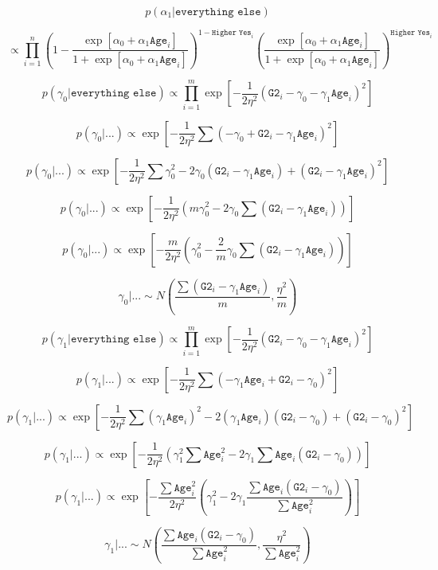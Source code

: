 \documentclass[11pt]{article}
\begin{document}
$$p(\alpha_1|\texttt{everything else})$$

$$\propto \prod_{i=1}^{n}(1-\frac{\exp[\alpha_0+\alpha_1\texttt{Age}_i]}{1+\exp[\alpha_0+\alpha_1\texttt{Age}_i]})^{1-\texttt{Higher Yes}_i}(\frac{\exp[\alpha_0+\alpha_1\texttt{Age}_i]}{1+\exp[\alpha_0+\alpha_1\texttt{Age}_i]})^{\texttt{Higher Yes}_i}$$

$$p(\gamma_0|\texttt{everything else}) \propto \prod_{i=1}^m  \exp \left[-\frac{1}{2\eta^2} (\texttt{G2}_i - \gamma_0 - \gamma_1 \texttt{Age}_i)^2 \right]$$

$$p(\gamma_0 | ...) \propto \exp \left[ -\frac{1}{2\eta^2} \sum (-\gamma_0 + \texttt{G2}_i - \gamma_1 \texttt{Age}_i)^2 \right]$$

$$p(\gamma_0 | ...) \propto \exp \left[ -\frac{1}{2\eta^2} \sum \gamma_0^2 - 2\gamma_0(\texttt{G2}_i - \gamma_1 \texttt{Age}_i) 
+  (\texttt{G2}_i - \gamma_1 \texttt{Age}_i)^2 \right]$$

$$p(\gamma_0 | ...) \propto \exp \left[ -\frac{1}{2\eta^2} (m\gamma_0^2 - 2\gamma_0\sum(\texttt{G2}_i - \gamma_1 \texttt{Age}_i)) \right]$$

$$p(\gamma_0 | ...) \propto \exp \left[ -\frac{m}{2\eta^2} (\gamma_0^2 - \frac{2}{m}\gamma_0\sum(\texttt{G2}_i - \gamma_1 \texttt{Age}_i)) \right]$$

$$\gamma_0 | ... \sim N\left( \frac{\sum(\texttt{G2}_i - \gamma_1 \texttt{Age}_i)}{m}, \frac{\eta^2}{m} \right)$$

$$p(\gamma_1|\texttt{everything else}) \propto \prod_{i=1}^m  \exp \left[-\frac{1}{2\eta^2} (\texttt{G2}_i - \gamma_0 - \gamma_1 \texttt{Age}_i)^2 \right]
$$

$$p(\gamma_1 | ...) \propto \exp \left[ -\frac{1}{2\eta^2} \sum (- \gamma_1 \texttt{Age}_i + \texttt{G2}_i -\gamma_0 )^2 \right]$$

$$p(\gamma_1 | ...) \propto \exp \left[ -\frac{1}{2\eta^2} \sum (\gamma_1 \texttt{Age}_i)^2 
-2 (\gamma_1 \texttt{Age}_i)(\texttt{G2}_i -\gamma_0 )
+ (\texttt{G2}_i -\gamma_0 )^2 \right]$$

$$p(\gamma_1 | ...) \propto \exp \left[ -\frac{1}{2\eta^2} 
(\gamma_1^2 \sum \texttt{Age}_i^2 
-2 \gamma_1 \sum \texttt{Age}_i(\texttt{G2}_i -\gamma_0 ))\right]$$

$$p(\gamma_1 | ...) \propto \exp \left[ -\frac{\sum\texttt{Age}_i^2}{2\eta^2} 
(\gamma_1^2
-2 \gamma_1 \frac{\sum \texttt{Age}_i(\texttt{G2}_i -\gamma_0 )}{\sum\texttt{Age}_i^2})\right]$$

$$\gamma_1 | ... \sim N\left( 
\frac{\sum \texttt{Age}_i(\texttt{G2}_i -\gamma_0 )}{\sum\texttt{Age}_i^2},
\frac{\eta^2}{\sum\texttt{Age}_i^2} \right)$$
\end{document}
